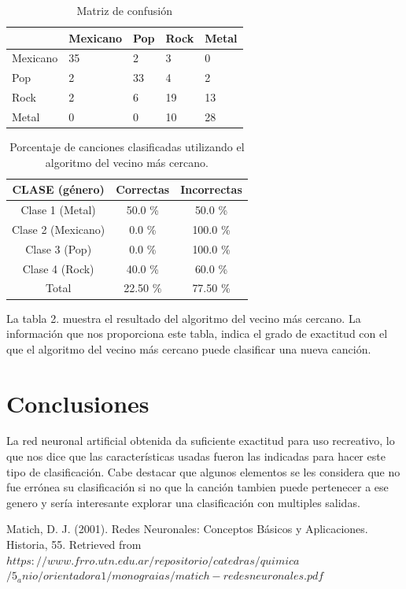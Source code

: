 \documentclass[conference]{IEEEtran}
\begin{document}
\begin{table}[h]
	\renewcommand{\tablename}{Tabla}
	\centering
	\caption{Matriz de confusión}
	\label{my-label}
	\begin{tabular}{l|l|l|l|l|}
	\cline{2-5}
							& Mexicano  & Pop & Rock & Metal \\ \hline
	\multicolumn{1}{|l|}{Mexicano} & 35 & 2  & 3  & 0  \\ \hline
	\multicolumn{1}{|l|}{Pop} &  2  & 33  & 4  &  2 \\ \hline
	\multicolumn{1}{|l|}{Rock} &  2  &  6 &  19 & 13  \\ \hline
	\multicolumn{1}{|l|}{Metal} &  0  & 0  & 10  & 28  \\ \hline
	\end{tabular}
	\end{table}



\begin{table}[h]
\renewcommand{\arraystretch}{1.3}
\renewcommand{\tablename}{Tabla}
\caption{ Porcentaje de canciones clasificadas utilizando el algoritmo del vecino más cercano. }
\label{table_example}
\centering
\begin{tabular}{|c|c|c|}
\hline
CLASE (género) & Correctas & Incorrectas \\
\hline
Clase 1 (Metal) & 50.0 \% & 50.0 \% \\
\hline
Clase 2 (Mexicano) & 0.0 \% & 100.0 \% \\
\hline
Clase 3 (Pop) & 0.0 \% & 100.0 \% \\
\hline
Clase 4 (Rock) & 40.0 \% & 60.0 \% \\
\hline
Total & 22.50 \% & 77.50 \% \\
\hline
\end{tabular}
\end{table}

La tabla 2. muestra el resultado del algoritmo del vecino más cercano. La información que nos proporciona este tabla, indica el grado de exactitud con el que el algoritmo del vecino más cercano puede clasificar una nueva canción. \\

\section{Conclusiones}
La red neuronal artificial obtenida da suficiente exactitud para uso recreativo, lo que nos dice que las características usadas fueron las indicadas para hacer este tipo de clasificación. Cabe destacar que algunos elementos se les considera que no fue errónea su clasificación si no que la canción tambien puede pertenecer a ese genero y sería interesante explorar una clasificación con multiples salidas. 

\begin{thebibliography}{1}

Matich, D. J. (2001). Redes Neuronales: Conceptos Básicos y Aplicaciones. Historia, 55. Retrieved from \\
\emph{$https://www.frro.utn.edu.ar/repositorio/catedras/quimica$
$/5 _ anio/orientadora1/monograias/matich-redesneuronales.pdf$}


\end{thebibliography}
\end{document}
